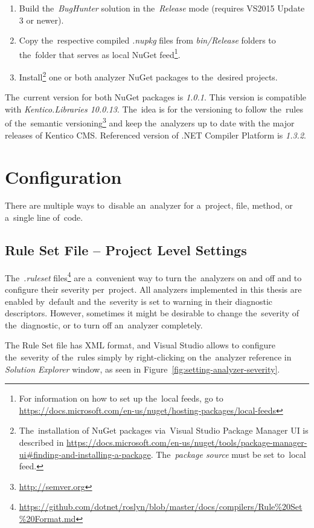 \documentclass[
  digital, %
  table,   %
  lof,     %
  lot,     %
  oneside,
]{fithesis3}
\begin{document}
\begin{enumerate}
\item Build the~\textit{BugHunter} solution in the~\textit{Release} mode (requires VS2015 Update 3 or newer).

\item Copy the~respective compiled \textit{.nupkg} files from \textit{bin/Release} folders to the~folder that serves as local NuGet feed\footnote{For information on how to set up the~local feeds, go to \url{https://docs.microsoft.com/en-us/nuget/hosting-packages/local-feeds}}.

\item Install\footnote{The~installation of NuGet packages via~Visual Studio Package Manager UI is described in \url{https://docs.microsoft.com/en-us/nuget/tools/package-manager-ui\#finding-and-installing-a-package}. The~\textit{package source} must be set to~local feed.} one or both analyzer NuGet packages to the~desired projects.
\end{enumerate}
 
The~current version for both NuGet packages is \textit{1.0.1}. This version is compatible with \textit{Kentico.Libraries 10.0.13}. The~idea is for the versioning to follow the~rules of the~semantic versioning\footnote{\url{http://semver.org}} and keep the~analyzers up to date with the major releases of Kentico CMS. Referenced version of .NET Compiler Platform is \textit{1.3.2}.

\section{Configuration}
There are multiple ways to~disable an~analyzer for a~project, file, method, or a~single line of~code. 

\subsection{Rule Set File -- Project Level Settings}
The~\textit{.ruleset} files\footnote{\url{https://github.com/dotnet/roslyn/blob/master/docs/compilers/Rule\%20Set\%20Format.md}} are a~convenient way to turn the~analyzers on and off and to configure their severity per~project. All analyzers implemented in this thesis are enabled by~default and the~severity is set to warning in their diagnostic descriptors. However, sometimes it might be desirable to change the~severity of the~diagnostic, or to turn off an~analyzer completely.

The Rule Set file has XML format, and Visual Studio allows to configure the~severity of the~rules simply by right-clicking on the~analyzer reference in \textit{Solution Explorer} window, as seen in Figure~\ref{fig:setting-analyzer-severity}.
\end{document}
